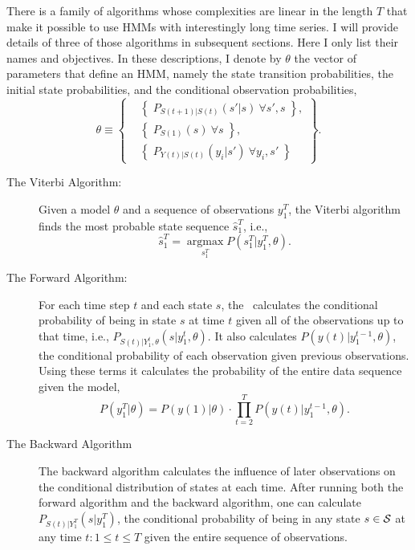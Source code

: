 \documentclass[]{article}
\newcommand{\parameters}{\theta}
\newcommand{\ts}[3]{#1_{#2}^{#3}}                    %
\newcommand{\argmax}{\operatorname*{argmax}}
\newcommand{\ti}[2]{{#1}{(#2)}}                  %
\newcommand{\states}{{\cal{S}}}
\newcommand{\ie}{i.e.\xspace}
\begin{document}
There is a family of algorithms whose complexities are linear in the
length $T$ that make it possible to use HMMs with interestingly long
time series.  I will provide details of three of those algorithms in
subsequent sections.  Here I only list their names and objectives.  In
these descriptions, I denote by $\parameters$ the vector of
parameters that define an HMM, namely the state transition
probabilities, the initial state probabilities, and the conditional
observation probabilities,
\begin{equation*}
   \parameters \equiv \left\{
     \begin{aligned}
       &\left\{\; P_{\ti{S}{t+1}|\ti{S}{t}} \left(s'|s
       \right)~\forall s',s \;\right\},\\
       & \left\{\; P_{\ti{S}{1}} \left(s \right)~\forall s
       \;\right\},\\
       &  \left\{\; P_{\ti{Y}{t}|\ti{S}{t}} \left(y_i|s' \right)
       ~ \forall y_i,s' \;\right\}
     \end{aligned}
   \right\}.
\end{equation*}
\begin{description}
\item[The Viterbi Algorithm:] Given a model
  $\parameters$ and a sequence of observations $\ts{y}{1}{T}$, the
  Viterbi algorithm finds the most probable state sequence
  $\ts{\hat{s}}{1}{T}$, \ie,
  \begin{equation}
    \label{eq:intro-viterbi}
    \ts{\hat s}{1}{T} = \argmax_{\ts{s}{1}{T}} P
    \left(\ts{s}{1}{T}|\ts{y}{1}{T},\parameters\right).
  \end{equation}
\item[The Forward Algorithm:] For each time step $t$ and each state
  $s$, the~ calculates the conditional
  probability of being in state $s$ at time $t$ given all of the
  observations up to that time, \ie,
  $P_{\ti{S}{t}|\ts{Y}{1}{t},\parameters} \left(s|\ts{y}{1}{t},
    \parameters \right)$. It also calculates
  $P\left(\ti{y}{t}|\ts{y}{1}{t-1}, \parameters \right)$, the
  conditional probability of each observation given previous
  observations.  Using these terms it calculates the probability of
  the entire data sequence given the model,
  \begin{equation*}
    P \left(\ts{y}{1}{T}|\parameters \right) =  P \left(\ti{y}{1}
      |\parameters \right) \cdot  \prod_{t=2}^T P
    \left(\ti{y}{t}|\ts{y}{1}{t-1}, \parameters \right).
  \end{equation*}
\item[The Backward Algorithm] The backward algorithm calculates the influence of later observations on the
  conditional distribution of states at each time.  After running both
  the forward algorithm and the backward algorithm, one can calculate
  $P_{\ti{S}{t}|\ts{Y}{1}{T}} \left(s|\ts{y}{1}{T} \right)$, the
  conditional probability of being in any state $s \in \states$ at any
  time $t: 1\leq t \leq T$ given the entire sequence of observations.
\end{description}
\end{document}
